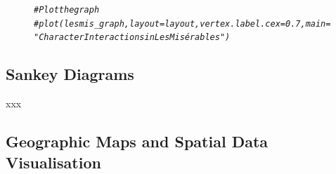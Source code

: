 \documentclass{article}\usepackage[]{graphicx}\usepackage[]{xcolor}
\makeatletter
\newcommand{\hlcom}[1]{\textcolor[rgb]{0.678,0.584,0.686}{\textit{#1}}}%
\newenvironment{kframe}{%
 \def\at@end@of@kframe{}%
 \ifinner\ifhmode%
  \def\at@end@of@kframe{\end{minipage}}%
  \begin{minipage}{\columnwidth}%
 \fi\fi%
 \def\FrameCommand##1{\hskip\@totalleftmargin \hskip-\fboxsep
 \colorbox{shadecolor}{##1}\hskip-\fboxsep
     \hskip-\linewidth \hskip-\@totalleftmargin \hskip\columnwidth}%
 \MakeFramed {\advance\hsize-\width
   \@totalleftmargin\z@ \linewidth\hsize
   \@setminipage}}%
 {\par\unskip\endMakeFramed%
 \at@end@of@kframe}
\newenvironment{knitrout}{}{} %
\makeatother
\begin{document}
\begin{figure}[h]
\centering
\begin{knitrout}
\color{fgcolor}\begin{kframe}
\begin{alltt}
\hlcom{# Plot the graph}
\hlcom{#plot(lesmis_graph, layout = layout, vertex.label.cex = 0.7, main = "Character Interactions in Les Misérables")}
\end{alltt}
\end{kframe}
\end{knitrout}
\end{figure}

\subsection{Sankey Diagrams}
xxx

\subsection{Geographic Maps and Spatial Data Visualisation}
\end{document}
